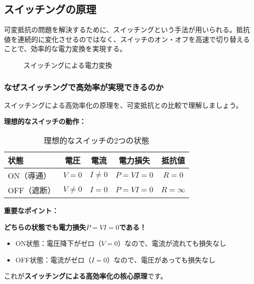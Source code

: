 \subsection{スイッチングの原理}

可変抵抗の問題を解決するために、スイッチングという手法が用いられる。抵抗値を連続的に変化させるのではなく、スイッチのオン・オフを高速で切り替えることで、効率的な電力変換を実現する。

\begin{figure}[H]
\centering
{}
\caption{スイッチングによる電力変換}
\label{fig:switching}
\end{figure}

\subsubsection{なぜスイッチングで高効率が実現できるのか}

スイッチングによる高効率化の原理を、可変抵抗との比較で理解しましょう。

\textbf{理想的なスイッチの動作：}

\begin{table}[H]
\centering
\caption{理想的なスイッチの2つの状態}
\begin{tabular}{|l|c|c|c|c|}
\hline
\textbf{状態} & \textbf{電圧} & \textbf{電流} & \textbf{電力損失} & \textbf{抵抗値} \\
\hline
\hline
ON（導通） & $V = 0$ & $I \neq 0$ & $P = VI = 0$ & $R = 0$ \\
\hline
OFF（遮断） & $V \neq 0$ & $I = 0$ & $P = VI = 0$ & $R = \infty$ \\
\hline
\end{tabular}
\end{table}

\begin{screen}
\textbf{重要なポイント：}

\textbf{どちらの状態でも電力損失$P = VI = 0$である！}

\begin{itemize}
\item ON状態：電圧降下がゼロ（$V=0$）なので、電流が流れても損失なし
\item OFF状態：電流がゼロ（$I=0$）なので、電圧があっても損失なし
\end{itemize}

これが\textbf{スイッチングによる高効率化の核心原理}です。
\end{screen}

